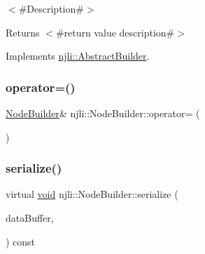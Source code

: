 $<$\#\+Description\#$>$

\begin{DoxyReturn}{Returns}
$<$\#return value description\#$>$ 
\end{DoxyReturn}


Implements \mbox{\hyperlink{classnjli_1_1_abstract_builder_a3e6e553e06d1ca30517ad5fb0bd4d000}{njli\+::\+Abstract\+Builder}}.

\mbox{\label{classnjli_1_1_node_builder_a4ce9324fccffdfad8eb10545bcce1cdf}} 
\subsubsection{\texorpdfstring{operator=()}{operator=()}}
{\footnotesize\ttfamily \mbox{\hyperlink{classnjli_1_1_node_builder}{Node\+Builder}}\& njli\+::\+Node\+Builder\+::operator= (\begin{DoxyParamCaption}\item[{const \mbox{\hyperlink{classnjli_1_1_node_builder}{Node\+Builder}} \&}]{ }\end{DoxyParamCaption})\hspace{0.3cm}{\ttfamily [protected]}}

\mbox{\label{classnjli_1_1_node_builder_abe6fbd5bd379bc9066cedc1bdeb926ad}} 
\subsubsection{\texorpdfstring{serialize()}{serialize()}}
{\footnotesize\ttfamily virtual \mbox{\hyperlink{_thread_8h_af1e856da2e658414cb2456cb6f7ebc66}{void}} njli\+::\+Node\+Builder\+::serialize (\begin{DoxyParamCaption}\item[{\mbox{\hyperlink{_thread_8h_af1e856da2e658414cb2456cb6f7ebc66}{void}} $\ast$}]{data\+Buffer,  }\item[{bt\+Serializer $\ast$}]{ }\end{DoxyParamCaption}) const\hspace{0.3cm}{\ttfamily [virtual]}}




